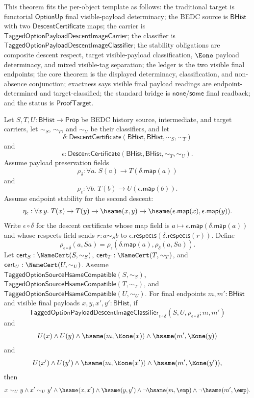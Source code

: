 \begin{theorem}
\label{thm:tagged-option-composite-image-classifier-visible-payload-determinacy}
This theorem fits the per-object template as follows: the traditional target is
functorial $\mathsf{OptionUp}$ final visible-payload determinacy; the BEDC
source is $\mathsf{BHist}$ with two $\mathsf{DescentCertificate}$ maps; the
carrier is $\mathsf{TaggedOptionPayloadDescentImageCarrier}$; the classifier is
$\mathsf{TaggedOptionPayloadDescentImageClassifier}$; the stability obligations
are composite descent respect, target visible-payload classification,
$\Eone$ payload determinacy, and mixed visible-tag separation; the ledger is the
two visible final endpoints; the core theorem is the displayed determinacy,
classification, and non-absence conjunction; exactness says visible final
payload readings are endpoint-determined and target-classified; the standard
bridge is $\mathsf{none}$/$\mathsf{some}$ final readback; and the status is
$\mathsf{ProofTarget}$.

Let $S,T,U:\mathsf{BHist}\to\mathsf{Prop}$ be BEDC history source,
intermediate, and target carriers, let $\sim_S$, $\sim_T$, and $\sim_U$ be their
classifiers, and let
$$
\delta:\mathsf{DescentCertificate}(\mathsf{BHist},\mathsf{BHist},\sim_S,\sim_T)
$$
and
$$
\epsilon:\mathsf{DescentCertificate}(\mathsf{BHist},\mathsf{BHist},\sim_T,\sim_U).
$$
Assume payload preservation fields
$$
\rho_{\delta}:\forall a.\;S(a)\to T(\delta.\mathsf{map}(a))
$$
and
$$
\rho_{\epsilon}:\forall b.\;T(b)\to U(\epsilon.\mathsf{map}(b)).
$$
Assume endpoint stability for the second descent:
$$
\eta_{\epsilon}:\forall x\,y.\;
T(x)\to T(y)\to \hsame(x,y)\to
\hsame(\epsilon.\mathsf{map}(x),\epsilon.\mathsf{map}(y)).
$$
Write $\epsilon\circ\delta$ for the descent certificate whose map field is
$a\mapsto\epsilon.\mathsf{map}(\delta.\mathsf{map}(a))$ and whose respects field
sends $r:a\sim_S b$ to
$\epsilon.\mathsf{respects}(\delta.\mathsf{respects}(r))$. Define
$$
\rho_{\epsilon\circ\delta}(a,Sa)=
\rho_{\epsilon}(\delta.\mathsf{map}(a),\rho_{\delta}(a,Sa)).
$$
Let $\mathsf{cert}_S:\NameCert(S,\sim_S)$,
$\mathsf{cert}_T:\NameCert(T,\sim_T)$, and
$\mathsf{cert}_U:\NameCert(U,\sim_U)$. Assume
$\mathsf{TaggedOptionSourceHsameCompatible}(S,\sim_S)$,
$\mathsf{TaggedOptionSourceHsameCompatible}(T,\sim_T)$, and
$\mathsf{TaggedOptionSourceHsameCompatible}(U,\sim_U)$. For final endpoints
$m,m':\mathsf{BHist}$ and visible final payloads
$x,y,x',y':\mathsf{BHist}$, if
$$
\mathsf{TaggedOptionPayloadDescentImageClassifier}_{\epsilon\circ\delta}
(S,U,\rho_{\epsilon\circ\delta};m,m')
$$
and
$$
U(x)\land U(y)\land
\hsame(m,\Eone(x))\land
\hsame(m',\Eone(y))
$$
and
$$
U(x')\land U(y')\land
\hsame(m,\Eone(x'))\land
\hsame(m',\Eone(y')),
$$
then
$$
x\sim_U y\land
x'\sim_U y'\land
\hsame(x,x')\land
\hsame(y,y')\land
\neg\hsame(m,\emp)\land
\neg\hsame(m',\emp).
$$
\end{theorem}
